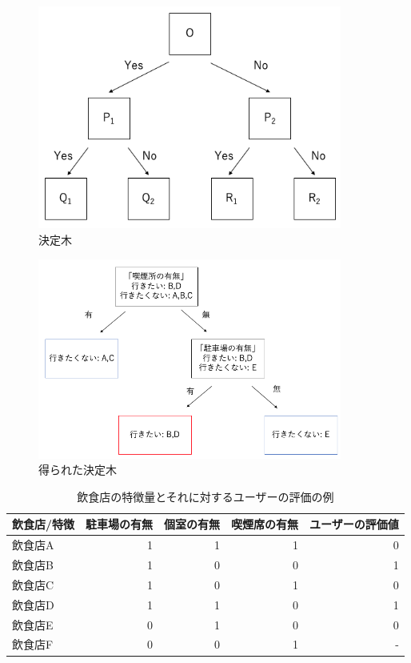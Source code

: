 \documentclass[12pt,a4j]{jreport}
\begin{document}
\begin{figure}[htbp]
  \begin{center}
    \includegraphics[width=10cm]{image/fig2.png}
    \caption{決定木}
    \label{fig2}
  \end{center}
\end{figure}

\begin{figure}[htbp]
  \begin{center}
    \includegraphics[width=10cm]{image/fig10.png}
    \caption{得られた決定木}
    \label{fig10}
  \end{center}
\end{figure}

\begin{table}[htbp]
  \begin{center}
    \begin{tabular}{|l|r|r|r|r|}\hline
      \textbf{飲食店/特徴} & 駐車場の有無 & 個室の有無 & 喫煙席の有無  &  ユーザーの評価値 \\ \hline
      飲食店A     & 1        & 1        & 1        & 0 \\ \hline
      飲食店B     & 1      & 0        & 0        & 1 \\ \hline
      飲食店C     & 1      & 0        & 1        & 0 \\ \hline
      飲食店D     & 1        & 1        & 0        & 1 \\ \hline
      飲食店E     & 0        & 1        & 0        & 0 \\ \hline
      飲食店F     & 0        & 0        & 1        & - \\ \hline
    \end{tabular}
  \end{center}
  \caption{飲食店の特徴量とそれに対するユーザーの評価の例}
  \label{table}
\end{table}
\end{document}
